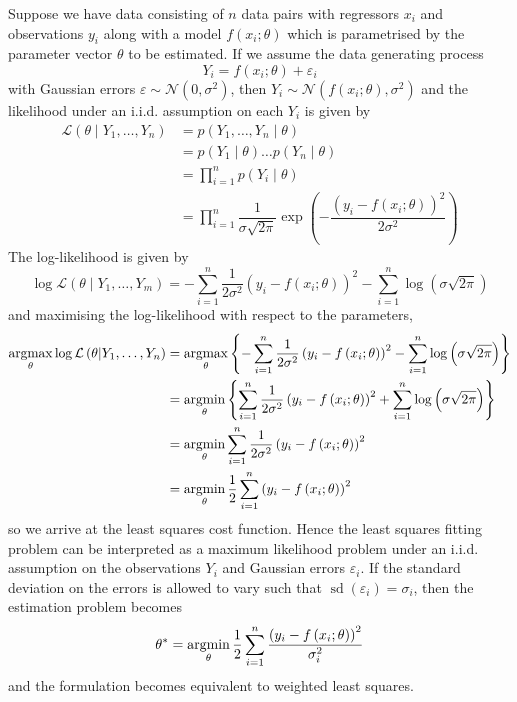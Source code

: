 \documentclass[11pt]{report} %
\begin{document}
Suppose we have data consisting of $n$ data pairs with regressors $x_{i}$ and observations $y_{i}$ along with a model $f\left(x_{i}; \theta\right)$ which is parametrised by the parameter vector $\theta$ to be estimated. If we assume the data generating process
\begin{equation}
Y_{i} = f\left(x_{i}; \theta\right) + \varepsilon_{i}
\end{equation}
with Gaussian errors $\varepsilon \sim \mathcal{N}\left(0, \sigma^{2}\right)$, then $Y_{i} \sim \mathcal{N}\left(f\left(x_{i}; \theta\right), \sigma^{2}\right)$ and the likelihood under an i.i.d. assumption on each $Y_{i}$ is given by
\begin{align}
\mathcal{L}\left(\theta\middle|Y_{1}, \dots, Y_{n}\right) &= p\left(Y_{1}, \dots, Y_{n}\middle|\theta\right) \\
&= p\left(Y_{1}\middle|\theta\right)\dots p\left(Y_{n}\middle|\theta\right) \\
&= \prod_{i = 1}^{n}p\left(Y_{i}\middle|\theta\right) \\
&= \prod_{i = 1}^{n}\dfrac{1}{\sigma\sqrt{2\pi}}\exp\left(-\dfrac{\left(y_{i} - f\left(x_{i};\theta\right)\right)^{2}}{2\sigma^{2}}\right)
\end{align}
The log-likelihood is given by
\begin{equation}
\log\mathcal{L}\left(\theta\middle|Y_{1}, \dots, Y_{m}\right) = -\sum_{i = 1}^{n}\dfrac{1}{2\sigma^{2}}\left(y_{i} - f\left(x_{i};\theta\right)\right)^{2} - \sum_{i = 1}^{n}\log\left(\sigma\sqrt{2\pi}\right)
\end{equation}
and maximising the log-likelihood with respect to the parameters,
\begin{align}
\operatorname*{argmax}_{\theta}\log\mathcal{L}\left(\theta\middle|Y_{1}, \dots, Y_{n}\right) &= \operatorname*{argmax}_{\theta}\left\{-\sum_{i = 1}^{n}\dfrac{1}{2\sigma^{2}}\left(y_{i} - f\left(x_{i};\theta\right)\right)^{2} - \sum_{i = 1}^{n}\log\left(\sigma\sqrt{2\pi}\right)\right\} \\
&= \operatorname*{argmin}_{\theta}\left\{\sum_{i = 1}^{n}\dfrac{1}{2\sigma^{2}}\left(y_{i} - f\left(x_{i};\theta\right)\right)^{2} + \sum_{i = 1}^{n}\log\left(\sigma\sqrt{2\pi}\right)\right\} \\
&= \operatorname*{argmin}_{\theta}\sum_{i = 1}^{n}\dfrac{1}{2\sigma^{2}}\left(y_{i} - f\left(x_{i};\theta\right)\right)^{2} \\
&= \operatorname*{argmin}_{\theta}\dfrac{1}{2}\sum_{i = 1}^{n}\left(y_{i} - f\left(x_{i};\theta\right)\right)^{2}
\end{align}
so we arrive at the least squares cost function. Hence the least squares fitting problem can be interpreted as a maximum likelihood problem under an i.i.d. assumption on the observations $Y_{i}$ and Gaussian errors $\varepsilon_{i}$. If the standard deviation on the errors is allowed to vary such that $\operatorname{sd}\left(\varepsilon_{i}\right) = \sigma_{i}$, then the estimation problem becomes
\begin{equation}
\theta^{*} = \operatorname*{argmin}_{\theta}\dfrac{1}{2}\sum_{i = 1}^{n}\dfrac{\left(y_{i} - f\left(x_{i};\theta\right)\right)^{2}}{\sigma_{i}^{2}}
\end{equation}
and the formulation becomes equivalent to weighted least squares.
\end{document}
